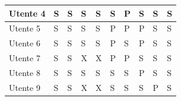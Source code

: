 \begin{table}[ht]
{\begin{tabular}{l|l|l|l|l|l|l|l|l|l|}
                \multicolumn{1}{|l|}{Utente 4} & S & S & S & S & S & P & S & S & S \\ \hline
                \multicolumn{1}{|l|}{Utente 5} & S & S & S & S & P & P & P & S & S \\ \hline
                \multicolumn{1}{|l|}{Utente 6} & S & S & S & S & P & S & P & S & S \\ \hline %
                \multicolumn{1}{|l|}{Utente 7} & S & S & X & X & P & P & S & S & S \\ \hline %
                \multicolumn{1}{|l|}{Utente 8} & S & S & S & S & S & S & P & S & S \\ \hline %
                \multicolumn{1}{|l|}{Utente 9} & S & S & X & X & S & S & S & P & S \\ \hline %
                \end{tabular}
                }
            \end{table}
            
